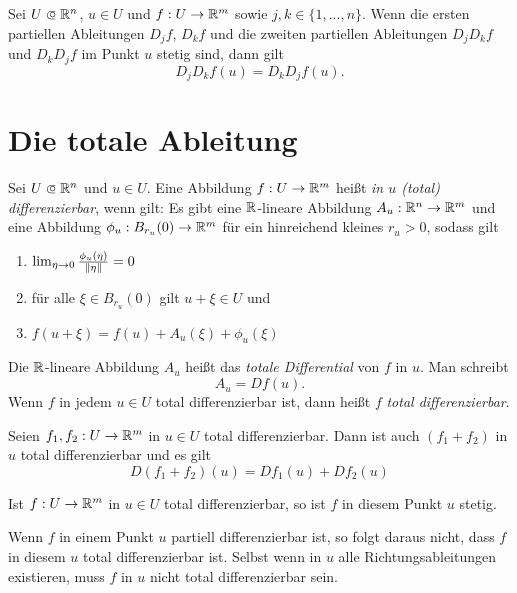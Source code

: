 \documentclass{cheat-sheet}
\begin{document}
\begin{samepage}

\begin{satz}
Sei $U \opn \R^n$, $u \in U$ und $f : U \to \mathbb{R}^m$ sowie $j, k \in \{ 1, ..., n \}$. Wenn die ersten partiellen Ableitungen $D_j f$, $D_k f$ und die zweiten partiellen Ableitungen $D_j D_k f$ und $D_k D_j f$ im Punkt $u$ stetig sind, dann gilt
\[ D_j D_k f(u) = D_k D_j f(u). \]
\end{satz}



\section{Die totale Ableitung}

\end{samepage}

\begin{defn}
Sei $U \opn \R^n$ und $u \in U$. Eine Abbildung $f : U \to \mathbb{R}^m$ heißt \emph{in $u$ (total) differenzierbar}, wenn gilt: Es gibt eine $\mathbb{R}$-lineare Abbildung $A_u : \mathbb{R}^n \to \mathbb{R}^m$ und eine Abbildung $\phi_u : B_{r_u}(0) \to \mathbb{R}^m$ für ein hinreichend kleines $r_u > 0$, sodass gilt
\begin{enumerate}
  \item $\lim_{\eta \to 0} \tfrac{ \phi_u(\eta) }{ \lVert\eta\rVert } = 0$
  \item für alle $\xi \in B_{r_u}(0)$ gilt $u + \xi \in U$ und
  \item $f(u + \xi) = f(u) + A_u(\xi) + \phi_u(\xi)$
\end{enumerate}
Die $\mathbb{R}$-lineare Abbildung $A_u$ heißt das \emph{totale Differential} von $f$ in $u$. Man schreibt
\[ A_u = D f(u). \]
Wenn $f$ in jedem $u \in U$ total differenzierbar ist, dann heißt $f$ \emph{total differenzierbar}.
\end{defn}

\begin{bem}
Seien $f_1, f_2 : U \to \mathbb{R}^m$ in $u \in U$ total differenzierbar. Dann ist auch $(f_1 + f_2)$ in $u$ total differenzierbar und es gilt
\[ D (f_1 + f_2)(u) = D f_1(u) + D f_2(u) \]
\end{bem}

\begin{satz}
Ist $f : U \to \mathbb{R}^m$ in $u \in U$ total differenzierbar, so ist $f$ in diesem Punkt $u$ stetig.
\end{satz}

\begin{acht}
Wenn $f$ in einem Punkt $u$ partiell differenzierbar ist, so folgt daraus nicht, dass $f$ in diesem $u$ total differenzierbar ist. Selbst wenn in $u$ alle Richtungsableitungen existieren, muss $f$ in $u$ nicht total differenzierbar sein.
\end{acht}
\end{document}
